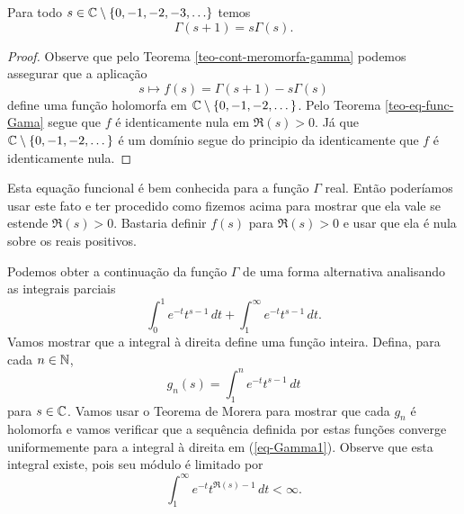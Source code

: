    
    
    \begin{corolario}
    \label{cor-eq-func-Gamma}
    Para todo $s\in \mathbb{C}\setminus\{0,-1,-2,-3,\ldots\}$ temos 
    \[
    \Gamma(s+1) = s\Gamma(s).
    \]
    \end{corolario}
    \begin{proof}
    Observe que pelo Teorema \ref{teo-cont-meromorfa-gamma} 
    podemos assegurar que a aplicação 
    \[
    s\longmapsto f(s) = \Gamma(s+1) - s\Gamma(s)
    \] 
    define uma função holomorfa em $\mathbb{C} \setminus \{0, -1, -2, \dots\}$. Pelo Teorema \ref{teo-eq-func-Gama} 
    segue que $f$ é identicamente nula em $\Re(s)> 0$. 
    Já que $\mathbb{C} \setminus \{0, -1, -2, \dots\}$ é um domínio segue do principio da identicamente que $f$ é identicamente nula.
    \end{proof}
    
    \medskip 
    Esta equação funcional é bem conhecida para a função $\Gamma$ real. Então poderíamos usar este fato e ter procedido como fizemos acima para mostrar que ela vale se estende 
    $\Re(s)> 0$. Bastaria definir $f(s)$ para $\Re(s)> 0$ e usar que ela é nula sobre os reais positivos.
    
    Podemos obter a continuação da função $\Gamma$ de uma forma alternativa analisando as integrais parciais
    \begin{equation}
    \label{eq-Gamma1}
    \int_{0}^{1}e^{-t}t^{s-1} \, dt + \int_{1}^{\infty}e^{-t}t^{s-1} \, dt.
    \end{equation}
    Vamos mostrar que a integral à direita define uma função inteira. Defina, para cada $n \in \mathbb{N}$,
    \[
    g_n(s) = \int_{1}^{n}e^{-t}t^{s-1} \, dt
    \]
    para $s \in \mathbb{C}$. Vamos usar o Teorema de Morera para mostrar que cada $g_n$ é holomorfa e vamos verificar que a sequência definida por estas funções converge uniformemente para a integral à direita em (\ref{eq-Gamma1}). Observe que esta integral existe, pois seu módulo é limitado por 
    $$\int_{1}^{\infty}e^{-t}t^{\Re(s) - 1} \, dt < \infty. $$
    
